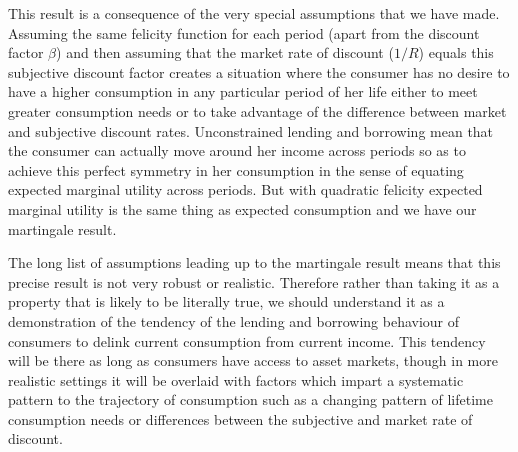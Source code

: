 \documentclass[12pt,reqno,openany]{amsbook}
\theoremstyle{plain}
\theoremstyle{definition}
\begin{document}
This result is a consequence of the very special
assumptions that we have made. Assuming the same felicity function for
each period (apart from the discount factor $\beta$) and then assuming that
the market rate of discount ($1/R$) equals this subjective discount factor
creates a situation where the consumer has no desire to have a higher
consumption in any particular period of her life either to meet
greater consumption needs or to take advantage of the difference
between market and subjective discount rates. Unconstrained lending
and borrowing mean that the consumer can actually move around her
income across periods so as to achieve this perfect symmetry in her
consumption in the sense of equating expected marginal utility across
periods. But with quadratic felicity expected marginal utility is the
same thing as expected consumption and we have our martingale result.

The long list of assumptions leading up to the martingale result means
that this precise result is not very robust or realistic. Therefore
rather than taking it as a property that is likely to be literally
true, we should understand it as a demonstration of the tendency of
the lending and borrowing behaviour of consumers to delink current
consumption from current income. This tendency will be there as long
as consumers have access to asset markets, though in more realistic
settings it will be overlaid with factors which impart a systematic
pattern to the trajectory of consumption such as a changing pattern of
lifetime consumption needs or differences between the subjective and
market rate of discount.
\end{document}
